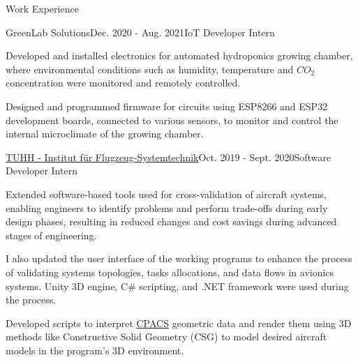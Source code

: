 \documentclass{resume} %
\begin{document}
\begin{rSection}{Work Experience}
\begin{rSubsection}{GreenLab Solutions}{Dec. 2020 - Aug. 2021}{IoT Developer Intern}{}

\item Developed and installed electronics for automated hydroponics growing chamber, where environmental conditions such as humidity, temperature and $CO_{2}$ concentration were monitored and remotely controlled.
\item Designed and programmed firmware for circuits using ESP8266 and ESP32 development boards, connected to various sensors, to monitor and control the internal microclimate of the growing chamber.
\end{rSubsection}

\begin{rSubsection}{\href{https://www.fst.tu-harburg.de/institut/willkommen}{TUHH - Institut f\"ur Flugzeug-Systemtechnik}}{Oct. 2019 - Sept. 2020}{Software Developer Intern}{}

\item Extended software-based tools used for cross-validation of aircraft systems, enabling engineers to identify problems and perform trade-offs during early design phases, resulting in reduced changes and cost savings during advanced stages of engineering.
\item I also updated the user interface of the working programs to enhance the process of validating systems topologies, tasks allocations, and data flows in avionics systems. Unity 3D engine, C\# scripting, and .NET framework were used during the process.
\item Developed scripts to interpret \href{https://cpacs.de/}{CPACS} geometric data and render them using 3D methods like Constructive Solid Geometry (CSG) to model desired aircraft models in the program's 3D environment.
\end{rSubsection}

\end{rSection}
\end{document}
